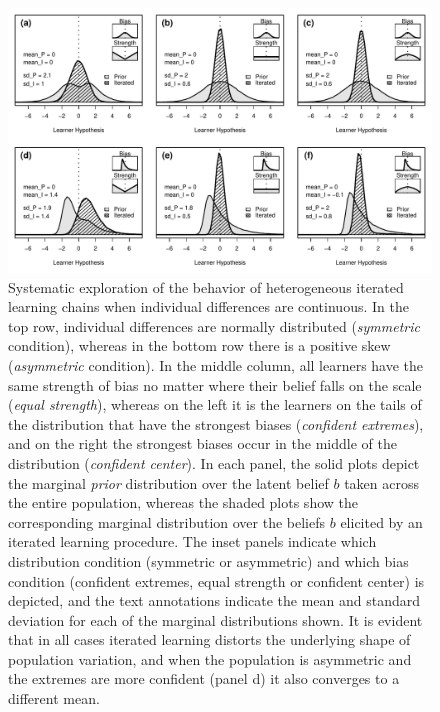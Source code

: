 \documentclass[doc]{apa6}
\begin{document}
\begin{figure}[p]
\begin{center}
\includegraphics[width=16cm]{cont-draw-plot.pdf}
\caption{\small{Systematic exploration of the behavior of heterogeneous iterated learning chains when individual differences are continuous}. In the top row, individual differences are normally distributed (\textit{symmetric} condition), whereas in the bottom row there is a positive skew (\textit{asymmetric} condition). In the middle column, all learners have the same strength of bias no matter where their belief falls on the scale (\textit{equal strength}), whereas on the left it is the learners on the tails of the distribution that have the strongest biases (\textit{confident extremes}), and on the right the strongest biases occur in the middle of the distribution (\textit{confident center}). In each panel, the solid plots depict the marginal \textit{prior} distribution over the latent belief $b$ taken across the entire population, whereas the shaded plots show the corresponding marginal distribution over the beliefs $b$ elicited by an iterated learning procedure. The inset panels indicate which distribution condition (symmetric or asymmetric) and which bias condition (confident extremes, equal strength or confident center) is depicted, and the text annotations indicate the mean and standard deviation for each of the marginal distributions shown. It is evident that in all cases iterated learning distorts the underlying shape of population variation, and when the population is asymmetric and the extremes are more confident (panel d) it also converges to a different mean.}
\label{fig:continuous}
\end{center}
\end{figure}
\end{document}
